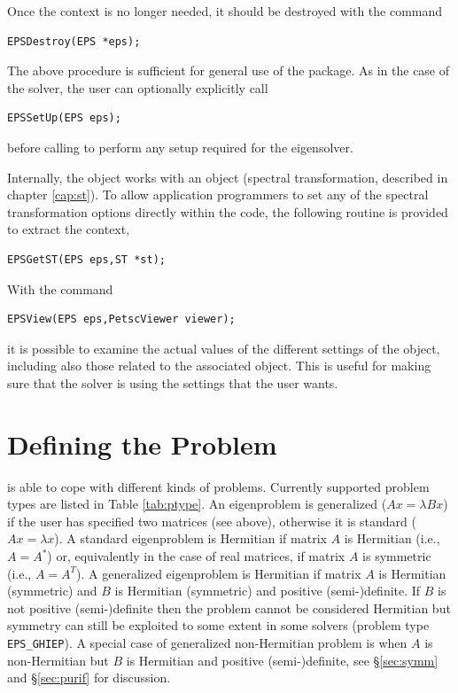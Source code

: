 	Once the  context is no longer needed, it should be destroyed with the command
	\begin{Verbatim}[fontsize=\small]
	EPSDestroy(EPS *eps);
	\end{Verbatim}

	The above procedure is sufficient for general use of the  package. As in the case of the  solver, the user can optionally explicitly call 
	\begin{Verbatim}[fontsize=\small]
	EPSSetUp(EPS eps);
	\end{Verbatim}
before calling  to perform any setup required for the eigensolver.

	Internally, the  object works with an  object (spectral transformation, described in chapter \ref{cap:st}). To allow application programmers to set any of the spectral transformation options directly within the code, the following routine is provided to extract the  context,
	\begin{Verbatim}[fontsize=\small]
	EPSGetST(EPS eps,ST *st);
	\end{Verbatim}
	
	With the command
	\begin{Verbatim}[fontsize=\small]
	EPSView(EPS eps,PetscViewer viewer);
	\end{Verbatim}
it is possible to examine the actual values of the different settings of the  object, including also those related to the associated  object. This is useful for making sure that the solver is using the settings that the user wants.

\section{Defining the Problem}
\label{sec:defprob}

	\slepc is able to cope with different kinds of problems. Currently supported problem types are listed in Table \ref{tab:ptype}. An eigenproblem is generalized ($Ax=\lambda Bx$) if the user has specified two matrices (see  above), otherwise it is standard ($Ax=\lambda x$). A standard eigenproblem is Hermitian if matrix $A$ is Hermitian (i.e., $A=A^*$) or, equivalently in the case of real matrices, if matrix $A$ is symmetric (i.e., $A=A^T$). A generalized eigenproblem is Hermitian if matrix $A$ is Hermitian (symmetric) and $B$ is Hermitian (symmetric) and positive (semi-)definite.
If $B$ is not positive (semi-)definite then the problem cannot be considered Hermitian but symmetry can still be exploited to some extent in some solvers (problem type \texttt{EPS\_GHIEP}).
A special case of generalized non-Hermitian problem is when $A$ is non-Hermitian but $B$ is Hermitian and positive (semi-)definite, see \S\ref{sec:symm} and \S\ref{sec:purif} for discussion.

